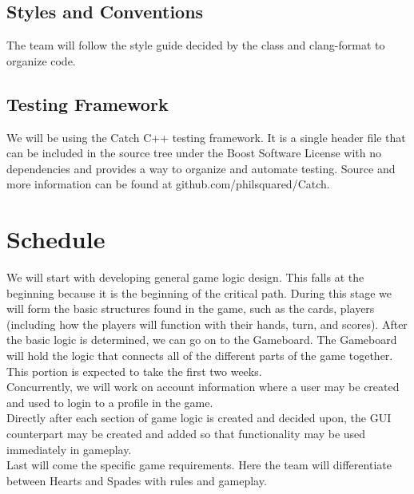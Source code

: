 \documentclass[11pt, titlepage]{article}
\begin{document}
    \subsection{Styles and Conventions}
    	The team will follow the style guide decided by the class and clang-format to organize code.

    \subsection{Testing Framework}
    	We will be using the Catch C++ testing framework.  It is a single header file that can be included in the source tree under the Boost Software License with no dependencies and provides a way to organize and automate testing.  Source and more information can be found at github.com/philsquared/Catch.

    \section{Schedule}

	\tab We will start with developing general game logic design.  This falls at the beginning because it is the beginning of the critical path.  During this stage we will form the basic structures found in the game, such as the cards, players (including how the players will function with their hands, turn, and scores).
	After the basic logic is determined, we can go on to the Gameboard.  The Gameboard will hold the logic that connects all of the different parts of the game together.  This portion is expected to take the first two weeks.\\

Concurrently, we will work on account information where a user may be created and used to login to a profile in the game. \\

Directly after each section of game logic is created and decided upon, the GUI counterpart may be created and added so that functionality may be used immediately in gameplay.\\

Last will come the specific game requirements.  Here the team will differentiate between Hearts and Spades with rules and gameplay.\\
\end{document}
